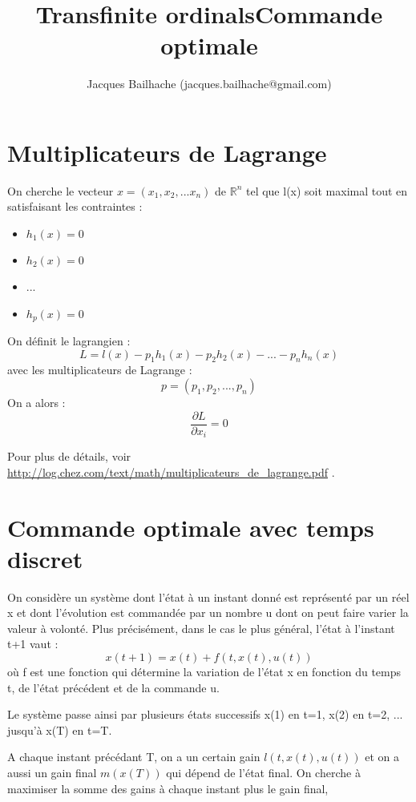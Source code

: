 \documentclass[10pt]{article}
\title{Transfinite ordinals}
\begin{document}
\title{Commande optimale}
\author{Jacques Bailhache (jacques.bailhache@gmail.com)}

\maketitle

\setlength{\parindent}{0pt}

\section{Multiplicateurs de Lagrange}

On cherche le vecteur \( x = (x_1, x_2, ... x_n) \) de \( \mathbb{R}^n \) tel que l(x) soit maximal tout en satisfaisant les contraintes :
\begin{itemize}
     \setlength{\itemsep}{1pt}
     \setlength{\parskip}{0pt}
     \setlength{\parsep}{0pt}
\item \( h_1(x) = 0 \)
\item \( h_2(x) = 0 \)
\item ...
\item \( h_p(x) = 0 \)
\end{itemize}

On définit le lagrangien : 
\[ L = l(x) - p_1 h_1(x) - p_2 h_2(x) - ... - p_n h_n(x) \]
avec les multiplicateurs de Lagrange :
\[ p = (p_1, p_2, ... , p_n) \]
On a alors :
\[ \frac{\partial L}{\partial x_i} = 0 \]

Pour plus de détails, voir \url{http://log.chez.com/text/math/multiplicateurs_de_lagrange.pdf} .

\section{Commande optimale avec temps discret}

On considère un système dont l'état à un instant donné est représenté par un réel x et dont l'évolution est commandée par un nombre u dont on peut faire varier la valeur à volonté. Plus précisément, dans le cas le plus général, l'état à l'instant t+1 vaut :
\[ x(t+1) = x(t) + f(t,x(t),u(t)) \]
où f est une fonction qui détermine la variation de l'état x en fonction du temps t, de l'état précédent et de la commande u.

Le système passe ainsi par plusieurs états successifs x(1) en t=1, x(2) en t=2, ... jusqu'à x(T) en t=T.

A chaque instant précédant T, on a un certain gain \( l(t,x(t),u(t)) \) et on a aussi un gain final \( m(x(T)) \) qui dépend de l'état final.
On cherche à maximiser la somme des gains à chaque instant plus le gain final, 
\end{document}
